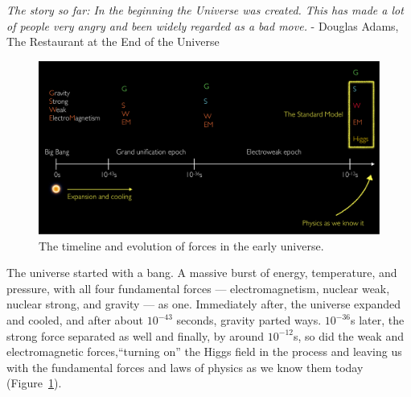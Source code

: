 \begin{dissertationintroduction}
\label{sec:intro}

\begin{center}
    \centering
    \noindent
    \textit{The story so far:
    In the beginning the Universe was created.
    This has made a lot of people very angry and been widely regarded as a bad move.
    }
    \baselineskip
    - Douglas Adams, The Restaurant at the End of the Universe
\end{center}

\baselineskip

\begin{figure}[h!]
    \centering
    \captionsetup{justification=centering}
    \includegraphics[width=\textwidth]{figures/00-Intro/universe_timeline.pdf}
    \caption{The timeline and evolution of forces in the early universe.}
    \label{fig:00_timeline}
\end{figure}

The universe started with a bang.
A massive burst of energy, temperature, and pressure, with all four fundamental forces --- electromagnetism, nuclear weak, nuclear strong, and gravity --- as one.
Immediately after, the universe expanded and cooled, and after about $10^{-43}$ seconds, gravity parted ways.
$10^{-36}$s later, the strong force separated as well and finally, by around $10^{-12}$s, so did the weak and electromagnetic forces,``turning on'' the Higgs field in the process and leaving us with the fundamental forces and laws of physics as we know them today (Figure~\ref{fig:00_timeline}).


\end{dissertationintroduction}
